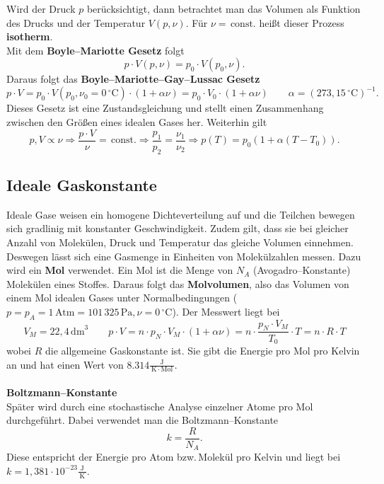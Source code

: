 \documentclass[a4paper,12pt]{article}
\begin{document}
Wird der Druck $p$ berücksichtigt, dann betrachtet man das Volumen als Funktion des Drucks und der Temperatur $V\left(p,\nu \right)$. Für $\nu =\,\text{const.}$ heißt dieser Prozess \textbf{isotherm}.\\\indent Mit dem \textbf{Boyle--Mariotte Gesetz} folgt
\[ 
        p\cdot V\left(p,\nu \right)=p_0\cdot V\left(p_0,\nu \right)
.\] 
Daraus folgt das \textbf{Boyle--Mariotte--Gay--Lussac Gesetz} 
\[ 
        p\cdot V=p_0\cdot V\left(p_0,\nu _0=0\,\text{$^\circ$C}\right)\cdot \left(1+\alpha \nu \right)=p_0\cdot V_0\cdot \left(1+\alpha \nu \right)\qquad \alpha =\left(273,15\,\text{$^\circ$C}\right)^{-1}
.\] 
Dieses Gesetz ist eine Zustandsgleichung und stellt einen Zusammenhang zwischen den Größen eines idealen Gases her. Weiterhin gilt
\[ 
        p,V \propto \nu \Rightarrow \dfrac{p\cdot V}{\nu }=\,\text{const.}\Rightarrow \dfrac{p_1}{p_2}=\dfrac{\nu _1}{\nu _2}\Rightarrow p\left(T\right)=p_0\left(1+\alpha \left(T-T_0\right)\right)
.\] 

\subsection{Ideale Gaskonstante}
Ideale Gase weisen ein homogene Dichteverteilung auf und die Teilchen bewegen sich gradlinig mit konstanter Geschwindigkeit. Zudem gilt, dass sie bei gleicher Anzahl von Molekülen, Druck und Temperatur das gleiche Volumen einnehmen. Deswegen lässt sich eine Gasmenge in Einheiten von Molekülzahlen messen. Dazu wird ein \textbf{Mol} verwendet. Ein Mol ist die Menge von $N_A$ (Avogadro--Konstante) Molekülen eines Stoffes. Daraus folgt das \textbf{Molvolumen}, also das Volumen von einem Mol idealen Gases unter Normalbedingungen ($p=p_A=1\,\text{Atm}=101\,325\,\text{Pa},\nu =0\,\text{$^\circ$C}$). Der Messwert liegt bei
\[ 
        V_M=22,4\,\text{dm}^3\qquad p\cdot V=n\cdot p_N\cdot V_M\cdot \left(1+\alpha \nu \right)=n\cdot \dfrac{p_N\cdot V_M}{T_0}\cdot T=n\cdot R\cdot T
\] 
wobei $R$ die allgemeine Gaskonstante ist. Sie gibt die Energie pro Mol pro Kelvin an und hat einen Wert von $8.314\tfrac{\,\text{J}\,}{\,\text{K}\,\cdot \,\text{Mol}\,}$.
\\\hfill\\\textbf{Boltzmann--Konstante}\\ 
Später wird durch eine stochastische Analyse einzelner Atome pro Mol durchgeführt. Dabei verwendet man die Boltzmann--Konstante
\[ 
        k=\dfrac{R}{N_A}
.\] 
Diese entspricht der Energie pro Atom bzw.\,Molekül pro Kelvin und liegt bei $k=1,381\cdot 10^{-23}\tfrac{\,\text{J}\,}{\,\text{K}\,}$.
\end{document}
